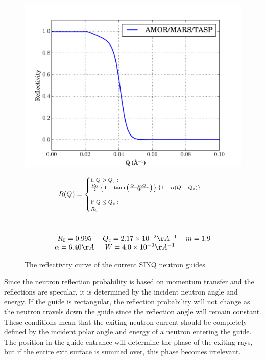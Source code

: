 \documentclass[a4paper]{jpconf}
\begin{document}
\begin{figure}[h]
\begin{minipage}{14pc}
\includegraphics[scale=.4]{graphics/refl.pdf}
\caption{\label{SINQ_reflectivity} The reflectivity curve of the current SINQ neutron guides.}
\end{minipage}\hspace{5pc}%
\begin{minipage}{11pc}
\begin{multline}\label{eq:ref}\scriptsize
R(Q) = 
\begin{cases}
    \mbox{if } Q > Q_c : \\
    \frac{R_0}{2}\left\{  1 - \tanh\left(  \frac{Q - m Q_c}{W}\right) \right\}\{1-\alpha(Q-Q_c)\} \\
    \\
    \mbox{if } Q \leq Q_c :\\
    R_0 \\
\end{cases} \\ \\ \\
\begin{tabular}{c c c}
$R_0=0.995$ & $Q_c=2.17\times10^{-2}\AA^{-1}$ & $m=1.9$ \\ 
$\alpha=6.40 \AA$ & $W=4.0\times10^{-3} \AA^{-1}$ 
\end{tabular} \\
\end{multline}
\end{minipage} 
\end{figure}

Since the neutron reflection probability is based on momentum transfer and the reflections are specular, it is determined by the incident neutron angle and energy.  If the guide is rectangular, the reflection probability will not change as the neutron travels down the guide since the reflection angle will remain constant.  These conditions mean that the exiting neutron current should be completely defined by the incident polar angle and energy of a neutron entering the guide.  The position in the guide entrance will determine the phase of the exiting rays, but if the entire exit surface is summed over, this phase becomes irrelevant.
\end{document}
